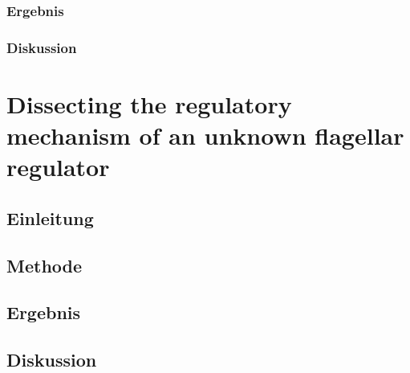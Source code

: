 \documentclass[oneside,10pt,a4paper]{report}
\begin{document}
			\subsection{Ergebnis}
			
			\subsection{Diskussion}
		
		
	\chapter{Dissecting the regulatory mechanism of an unknown flagellar regulator}
		\section{Einleitung}
		
		\section{Methode}
		
		\section{Ergebnis}
		
		\section{Diskussion}

	
	
\end{document}
